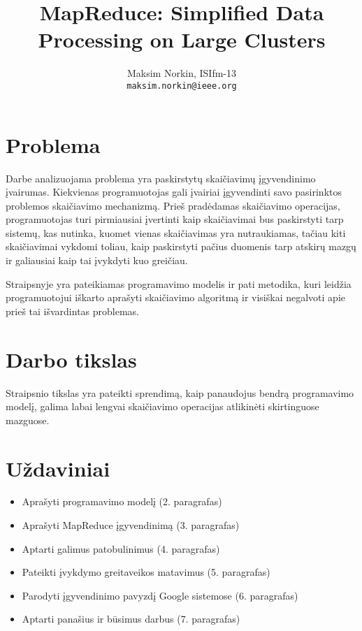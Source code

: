 \documentclass[10pt, onecolumn]{IEEEtran}
\author{Maksim Norkin, ISIfm-13\\ \texttt{maksim.norkin@ieee.org}}
\title{MapReduce: Simplified Data Processing on Large Clusters}
\begin{document}
	\maketitle

	\section{Problema}

		Darbe analizuojama problema yra paskirstytų skaičiavimų įgyvendinimo įvairumas. Kiekvienas programuotojas gali įvairiai įgyvendinti savo pasirinktos problemos skaičiavimo mechanizmą. Prieš pradėdamas skaičiavimo operacijas, programuotojas turi pirmiausiai įvertinti kaip skaičiavimai bus paskirstyti tarp sistemų, kas nutinka, kuomet vienas skaičiavimas yra nutraukiamas, tačiau kiti skaičiavimai vykdomi toliau, kaip paskirstyti pačius duomenis tarp atskirų mazgų ir galiausiai kaip tai įvykdyti kuo greičiau. 

		Straipsnyje yra pateikiamas programavimo modelis ir pati metodika, kuri leidžia programuotojui iškarto aprašyti skaičiavimo algoritmą ir visiškai negalvoti apie prieš tai išvardintas problemas. 

	\section{Darbo tikslas}

		Straipsnio tikslas yra pateikti sprendimą, kaip panaudojus bendrą programavimo modelį, galima labai lengvai skaičiavimo operacijas atlikinėti skirtinguose mazguose.

	\section{Uždaviniai}

		\begin{itemize}
	      \item Aprašyti programavimo modelį (2. paragrafas)
	      \item Aprašyti MapReduce įgyvendinimą (3. paragrafas)
	      \item Aptarti galimus patobulinimus (4. paragrafas)
	      \item Pateikti įvykdymo greitaveikos matavimus (5. paragrafas)
	      \item Parodyti įgyvendinimo pavyzdį Google sistemose (6. paragrafas)
	      \item Aptarti panašius ir būsimus darbus (7. paragrafas)
	    \end{itemize}
\end{document}
